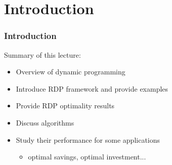 


\subtitle{Dynamic Programming}

\author{John Stachurski}

\date{September 2022}




\begin{frame}
  \titlepage
\end{frame}


\section{Introduction}


\begin{frame}
    \frametitle{Introduction}

    Summary of this lecture:

    \begin{itemize}
        \item Overview of dynamic programming
            \vspace{0.3em}
            \vspace{0.3em}
        \item Introduce RDP framework and provide examples
            \vspace{0.3em}
            \vspace{0.3em}
        \item Provide RDP optimality results
            \vspace{0.3em}
            \vspace{0.3em}
        \item Discuss algorithms
            \vspace{0.3em}
            \vspace{0.3em}
        \item Study their performance for some applications
            \vspace{0.3em}
            \vspace{0.3em}
            \begin{itemize}
                \item optimal savings, optimal investment...
            \end{itemize}
    \end{itemize}

            \vspace{0.3em}
            \vspace{0.3em}


\end{frame}





